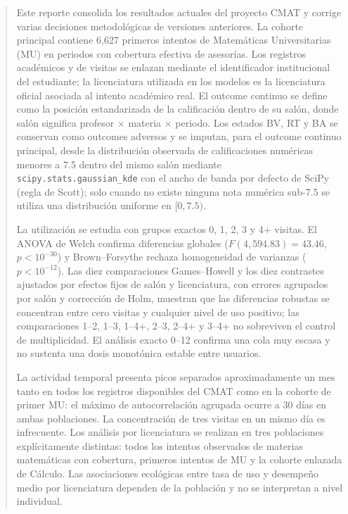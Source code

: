 \documentclass[11pt,letterpaper]{article}
\begin{document}
\begin{abstract}
Este reporte consolida los resultados actuales del proyecto CMAT y corrige varias decisiones metodológicas de versiones anteriores. La cohorte principal contiene 6,627 primeros intentos de Matemáticas Universitarias (MU) en periodos con cobertura efectiva de asesorías. Los registros académicos y de visitas se enlazan mediante el identificador institucional del estudiante; la licenciatura utilizada en los modelos es la licenciatura oficial asociada al intento académico real. El outcome continuo se define como la posición estandarizada de la calificación dentro de su salón, donde salón significa profesor $\times$ materia $\times$ periodo. Los estados BV, RT y BA se conservan como outcomes adversos y se imputan, para el outcome continuo principal, desde la distribución observada de calificaciones numéricas menores a 7.5 dentro del mismo salón mediante \texttt{scipy.stats.gaussian\_kde} con el ancho de banda por defecto de SciPy (regla de Scott); solo cuando no existe ninguna nota numérica sub-7.5 se utiliza una distribución uniforme en $[0,7.5)$.

La utilización se estudia con grupos exactos 0, 1, 2, 3 y 4+ visitas. El ANOVA de Welch confirma diferencias globales ($F(4,594.83)=43.46$, $p<10^{-30}$) y Brown--Forsythe rechaza homogeneidad de varianzas ($p<10^{-12}$). Las diez comparaciones Games--Howell y los diez contrastes ajustados por efectos fijos de salón y licenciatura, con errores agrupados por salón y corrección de Holm, muestran que las diferencias robustas se concentran entre cero visitas y cualquier nivel de uso positivo; las comparaciones 1--2, 1--3, 1--4+, 2--3, 2--4+ y 3--4+ no sobreviven el control de multiplicidad. El análisis exacto 0--12 confirma una cola muy escasa y no sustenta una dosis monotónica estable entre usuarios.

La actividad temporal presenta picos separados aproximadamente un mes tanto en todos los registros disponibles del CMAT como en la cohorte de primer MU: el máximo de autocorrelación agrupada ocurre a 30 días en ambas poblaciones. La concentración de tres visitas en un mismo día es infrecuente. Los análisis por licenciatura se realizan en tres poblaciones explícitamente distintas: todos los intentos observados de materias matemáticas con cobertura, primeros intentos de MU y la cohorte enlazada de Cálculo. Las asociaciones ecológicas entre tasa de uso y desempeño medio por licenciatura dependen de la población y no se interpretan a nivel individual.


\end{abstract}
\end{document}
